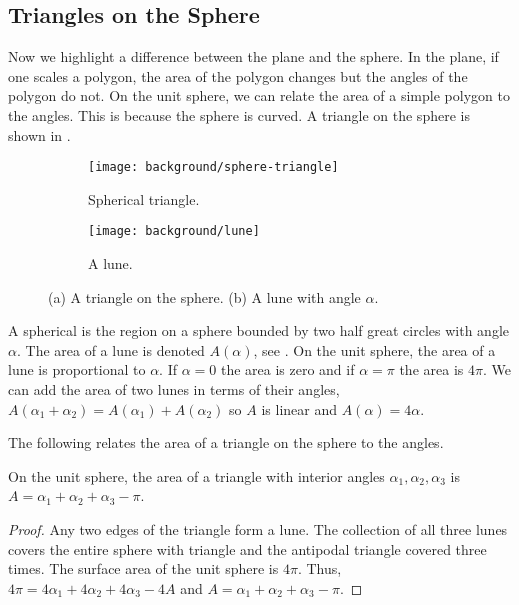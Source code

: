 	
\subsection{Triangles on the Sphere}

Now we highlight a difference between the plane and the sphere.
In the plane, if one scales a polygon, the area of the polygon changes
but the angles of the polygon do not.
On the unit sphere, we can relate the area of a simple polygon 
to the angles. This is because the sphere is curved.
A triangle on the sphere is shown in .


 \begin{figure}[htb]
         \centering
        \begin{subfigure}[b]{0.35\textwidth}
         \texttt{[image: background/sphere-triangle]}
         \caption{Spherical triangle.}
 	 \label{fig:sphere-triangle}
       \end{subfigure}
         \hspace{1cm}
         \begin{subfigure}[b]{0.35\textwidth}
         \texttt{[image: background/lune]}
         \caption{A lune.}
          \label{fig:lune}
         \end{subfigure}
		\caption{(a) A triangle on the sphere.
 		(b) A lune with angle $\alpha$.
 		\label{fig:sphere-lune}}
 \end{figure}
A spherical  is the region on a sphere bounded by two half great circles
with angle $\alpha$. The area of a lune is denoted $A(\alpha)$,
 see .
On the unit sphere, the area of a lune is proportional to $\alpha$. 
If $\alpha=0$ the area is zero and if $\alpha=\pi$ the area is $4\pi$.
We can add the area of two lunes in terms of their angles, 
$A(\alpha_1+\alpha_2)=A(\alpha_1)+A(\alpha_2)$ so $A$ is linear
and  $A(\alpha)=4\alpha.$




The following relates the area of a triangle on the sphere to the angles.

\begin{lemma}\label{lem:spherical-triangle}
On the unit sphere, the area of a triangle with interior angles $\alpha_1, \alpha_2, \alpha_3$
is $A=\alpha_1+\alpha_2+\alpha_3-\pi$.
\end{lemma}

\begin{proof}
	Any two edges of the triangle form a lune. The collection of 
	all three lunes covers the entire sphere with triangle and the antipodal triangle covered three times.
 	The surface area of the unit sphere is $4\pi$.
	Thus, $4\pi=4\alpha_1+4\alpha_2+4\alpha_3-4A$
	and $A=\alpha_1+\alpha_2+\alpha_3-\pi$.
	
\end{proof}

